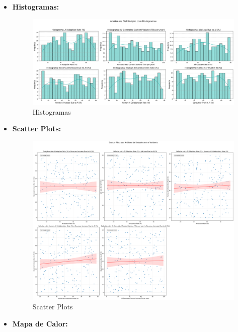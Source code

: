 \documentclass[12pt]{article}
\begin{document}
\begin{itemize}
    \item \textbf{Histogramas:}
    \begin{figure}[H]
        \centering
        \includegraphics[width=1\textwidth]{histogramas.png}
        \caption{Histogramas}
    \end{figure}
\newpage
    \item \textbf{Scatter Plots:}
    \begin{figure}[H]
        \centering
        \includegraphics[width=1\textwidth]{scatter.png}
        \caption{Scatter Plots}
    \end{figure}
\newpage
    \item \textbf{Mapa de Calor:}
    \begin{figure}[H]
        \centering

\end{figure}
\end{itemize}
\end{document}
